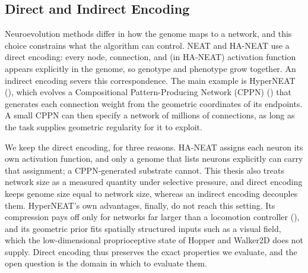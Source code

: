\documentclass[12pt]{article}
\begin{document}
\subsection{Direct and Indirect Encoding}
\label{subsec:direct-and-indirect-encoding}


Neuroevolution methods differ in how the genome maps to a network, and this choice constrains what the algorithm can control.
NEAT and HA-NEAT use a direct encoding: every node, connection, and (in HA-NEAT) activation function appears explicitly in the genome, so genotype and phenotype grow together.
An indirect encoding severs this correspondence.
The main example is HyperNEAT (\cite{stanley_hypercubebased_2009}), which evolves a Compositional Pattern-Producing Network (CPPN) (\cite{stanley_compositional_2007}) that generates each connection weight from the geometric coordinates of its endpoints.
A small CPPN can then specify a network of millions of connections, as long as the task supplies geometric regularity for it to exploit.

We keep the direct encoding, for three reasons.
HA-NEAT assigns each neuron its own activation function, and only a genome that lists neurons explicitly can carry that assignment; a CPPN-generated substrate cannot.
This thesis also treats network size as a measured quantity under selective pressure, and direct encoding keeps genome size equal to network size, whereas an indirect encoding decouples them.
HyperNEAT's own advantages, finally, do not reach this setting.
Its compression pays off only for networks far larger than a locomotion controller (\cite{stanley_hypercubebased_2009}), and its geometric prior fits spatially structured inputs such as a visual field, which the low-dimensional proprioceptive state of Hopper and Walker2D does not supply.
Direct encoding thus preserves the exact properties we evaluate, and the open question is the domain in which to evaluate them.
\end{document}
